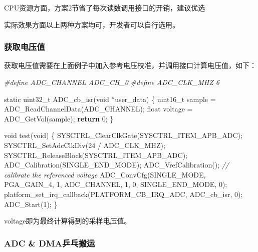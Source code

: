 \documentclass[
  12pt,
]{book}
\newenvironment{Shaded}{\begin{snugshade}}{\end{snugshade}}
\newcommand{\CommentTok}[1]{\textcolor[rgb]{0.56,0.35,0.01}{\textit{#1}}}
\newcommand{\ControlFlowTok}[1]{\textcolor[rgb]{0.13,0.29,0.53}{\textbf{#1}}}
\newcommand{\DataTypeTok}[1]{\textcolor[rgb]{0.13,0.29,0.53}{#1}}
\newcommand{\DecValTok}[1]{\textcolor[rgb]{0.00,0.00,0.81}{#1}}
\newcommand{\NormalTok}[1]{#1}
\newcommand{\PreprocessorTok}[1]{\textcolor[rgb]{0.56,0.35,0.01}{\textit{#1}}}
\begin{document}
CPU资源方面，方案2节省了每次读数调用接口的开销，建议优选

实际效果方面以上两种方案均可，开发者可以自行选用。

\hypertarget{ux83b7ux53d6ux7535ux538bux503c}{%
\subsubsection{获取电压值}\label{ux83b7ux53d6ux7535ux538bux503c}}

获取电压值需要在上面例子中加入参考电压校准，并调用接口计算电压值，如下：

\begin{Shaded}
\begin{Highlighting}[]
\PreprocessorTok{#define ADC_CHANNEL    ADC_CH_0}
\PreprocessorTok{#define ADC_CLK_MHZ    6}

\DataTypeTok{static} \DataTypeTok{uint32_t}\NormalTok{ ADC_cb_isr(}\DataTypeTok{void}\NormalTok{ *user_data)}
\NormalTok{\{}
    \DataTypeTok{uint16_t}\NormalTok{ sample = ADC_ReadChannelData(ADC_CHANNEL);}
    \DataTypeTok{float}\NormalTok{ voltage = ADC_GetVol(sample);}
    \ControlFlowTok{return} \DecValTok{0}\NormalTok{;}
\NormalTok{\}}

\DataTypeTok{void}\NormalTok{ test(}\DataTypeTok{void}\NormalTok{)}
\NormalTok{\{}
\NormalTok{    SYSCTRL_ClearClkGate(SYSCTRL_ITEM_APB_ADC);}
\NormalTok{    SYSCTRL_SetAdcClkDiv(}\DecValTok{24}\NormalTok{ / ADC_CLK_MHZ);}
\NormalTok{    SYSCTRL_ReleaseBlock(SYSCTRL_ITEM_APB_ADC);}
\NormalTok{    ADC_Calibration(SINGLE_END_MODE);}
\NormalTok{    ADC_VrefCalibration();      }\CommentTok{// calibrate the referenced voltage}
\NormalTok{    ADC_ConvCfg(SINGLE_MODE, PGA_GAIN_4, }\DecValTok{1}\NormalTok{, ADC_CHANNEL, }\DecValTok{1}\NormalTok{, }\DecValTok{0}\NormalTok{, SINGLE_END_MODE, }\DecValTok{0}\NormalTok{);}
\NormalTok{    platform_set_irq_callback(PLATFORM_CB_IRQ_ADC, ADC_cb_isr, }\DecValTok{0}\NormalTok{);}
\NormalTok{    ADC_Start(}\DecValTok{1}\NormalTok{);}
\NormalTok{\}}
\end{Highlighting}
\end{Shaded}

voltage即为最终计算得到的采样电压值。

\hypertarget{adc-dmaux4e52ux4e53ux642cux8fd0}{%
\subsubsection{ADC \& DMA乒乓搬运}\label{adc-dmaux4e52ux4e53ux642cux8fd0}}
\end{document}
